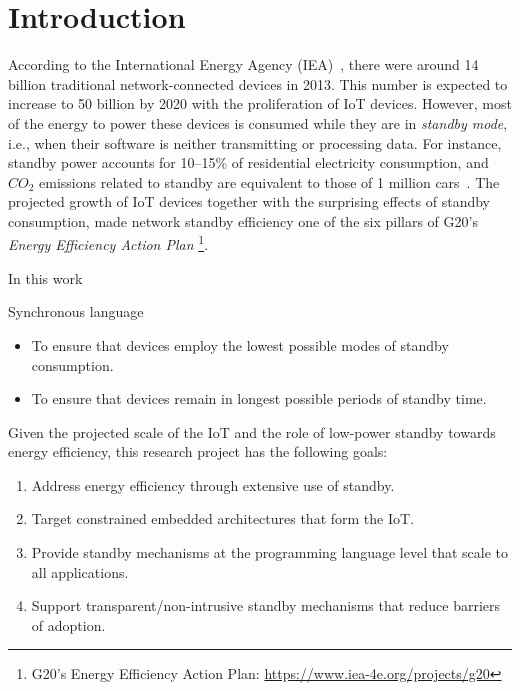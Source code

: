 \section{Introduction}
\label{sec.introduction}

According to the International Energy Agency (IEA)~\cite{iea.data}, there were
around 14 billion traditional network-connected devices in 2013.
This number is expected to increase to 50 billion by 2020 with
the proliferation of IoT devices. %
%
%
However, most of the energy to power these devices is consumed while they are
in \emph{standby mode}, i.e., when their software is neither transmitting or
processing data.
%
For instance, standby power accounts for 10--15\% of residential electricity
consumption, and $CO_2$ emissions related to standby are equivalent to those of
1 million cars~\cite{iea.data,standby.australia}.
%
%
The projected growth of IoT devices together with the surprising effects of
standby consumption, made network standby efficiency one of the six
pillars of G20's \emph{Energy Efficiency Action Plan}%
\footnote{G20's Energy Efficiency Action Plan: \url{https://www.iea-4e.org/projects/g20}}.

In this work

Synchronous language


%
\begin{itemize}
    \item To ensure that devices employ the lowest possible modes of standby consumption.
    \item To ensure that devices remain in longest possible periods of standby time.
\end{itemize}

Given the projected scale of the IoT and the role of low-power standby towards
energy efficiency, this research project has the following goals:

\begin{enumerate}
    \item Address energy efficiency through extensive use of standby.
    \item Target constrained embedded architectures that form the IoT.
    \item Provide standby mechanisms at the programming language level that scale to all applications.
    \item Support transparent/non-intrusive standby mechanisms that reduce barriers of adoption.
\end{enumerate}

